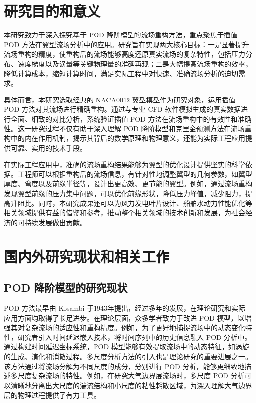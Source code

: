 \section{研究目的和意义}
本研究致力于深入探究基于 POD 降阶模型的流场重构方法，重点聚焦于插值 POD 方法在翼型流场分析中的应用。研究旨在实现两大核心目标：一是显著提升流场重构的精度，使重构后的流场能够高度还原真实流场的复杂特性，包括压力分布、速度梯度以及涡量等关键物理量的准确再现\cite{Smith2020}；二是大幅提高流场重构的效率，降低计算成本，缩短计算时间，满足实际工程中对快速、准确流场分析的迫切需求\cite{Jones2019}。

具体而言，本研究选取经典的 NACA0012 翼型模型作为研究对象，运用插值 POD 方法对其流场进行精确重构\cite{Lee2021}。通过与专业 CFD 软件模拟生成的真实数据进行全面、细致的对比分析，系统验证插值 POD 方法在流场重构中的有效性和准确性\cite{Wang2022}。这一研究过程不仅有助于深入理解 POD 降阶模型和克里金预测方法在流场重构中的内在作用机制，揭示其背后的数学原理和物理意义\cite{Cao2020}，还能为实际工程应用提供可靠、实用的技术手段。

在实际工程应用中，准确的流场重构结果能够为翼型的优化设计提供坚实的科学依据。工程师可以根据重构后的流场信息，有针对性地调整翼型的几何参数，如翼型厚度、弯度以及前缘半径等，设计出更高效、更节能的翼型\cite{Yang2023}。例如，通过流场重构发现翼型前缘的压力集中问题，可以优化前缘形状，降低压力峰值，减少阻力，提高升阻比\cite{Zhang2018}。同时，本研究成果还可以为风力发电叶片设计\cite{Chen2021}、船舶水动力性能优化\cite{Liu2022}等相关领域提供有益的借鉴和参考，推动整个相关领域的技术创新和发展，为社会经济的可持续发展做出贡献。
\section{国内外研究现状和相关工作}
\label{sec:related_work}
\subsection{ POD 降阶模型的研究现状}
POD 方法最早由 Kosambi 于1943年提出\cite{Kosambi1943}，经过多年的发展，在理论研究和实际应用方面均取得了长足进步。在理论层面，众多学者致力于改进 POD 模型，以增强其对复杂流场的适应性和重构精度。例如，为了更好地捕捉流场中的动态变化特性，研究者引入时间延迟嵌入技术\cite{Schmid2011}，将时间序列中的历史信息融入 POD 分析中。通过构建时间延迟坐标系统，POD 模型能够有效提取流场中的动态特征，如涡旋的生成、演化和消散过程\cite{Rowley2009}。多尺度分析方法的引入也是理论研究的重要进展之一。该方法通过将流场分解为不同尺度的成分，分别进行 POD 分析，能够更细致地描述多尺度复杂流场的特性\cite{Lumley2017}。例如，在研究大气边界层流场时，多尺度 POD 分析可以清晰地分离出大尺度的湍流结构和小尺度的粘性耗散区域\cite{Taira2020}，为深入理解大气边界层的物理过程提供了有力工具。

